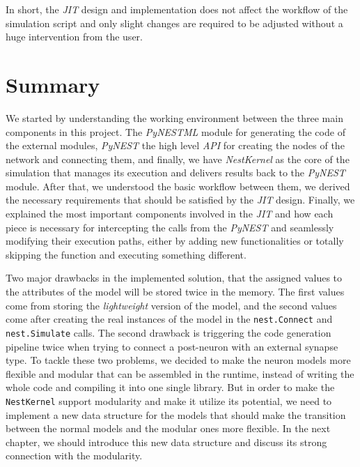 In short, the \emph{JIT} design and implementation does not affect the workflow of the simulation script and only slight changes are required to be adjusted without a huge intervention from the user.

\section{Summary}

We started by understanding the working environment between the three main components in this project. The \emph{PyNESTML} module for generating the code of the external modules, \emph{PyNEST} the high level \emph{API} for creating the nodes of the network and connecting them, and finally, we  have \emph{NestKernel} as the core of the simulation that manages its execution and delivers results back to the \emph{PyNEST} module. After that, we understood the basic workflow between them, we derived the necessary requirements that should be satisfied by the \emph{JIT} design. Finally, we explained the most important components involved in the \emph{JIT} and how each piece is necessary for intercepting the calls from the \emph{PyNEST} and seamlessly modifying their execution paths, either by adding new functionalities or totally skipping the function and executing something different.


Two major drawbacks in the implemented solution, that the assigned values to the attributes of the model will be stored twice in the memory. The first values come from storing the \emph{lightweight} version of the model, and the second values come after creating the real instances of the model in the \texttt{nest.Connect} and \texttt{nest.Simulate} calls. The second drawback is triggering the code generation pipeline twice when trying to connect a post-neuron with an external synapse type. To tackle these two problems, we decided to make the neuron models more flexible and modular that can be assembled in the runtime, instead of writing the whole code and compiling it into one single library. But in order to make the \texttt{NestKernel} support modularity and make it utilize its potential, we need to implement a new data structure for the models that should make the transition between the normal models and the modular ones more flexible. In the next chapter, we should introduce this new data structure and discuss its strong connection with the modularity.


